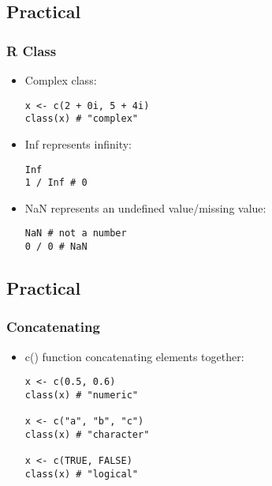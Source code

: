 \documentclass[11pt]{beamer}
\begin{document}
\subsection{Practical}
\begin{frame}[fragile]
\frametitle{{\sf R} Class}
\begin{itemize}
\item Complex class: 
\vspace{0.1in}
\begin{verbatim}
x <- c(2 + 0i, 5 + 4i)
class(x) # "complex"
\end{verbatim}
\vspace{0.1in}
\item Inf represents infinity:
\begin{verbatim}
Inf
1 / Inf # 0
\end{verbatim}
\vspace{0.1in}
\item NaN represents an undefined value/missing value:
\begin{verbatim}
NaN # not a number
0 / 0 # NaN 
\end{verbatim}
\end{itemize}
\end{frame}



\subsection{Practical}
\begin{frame}[fragile]
\frametitle{Concatenating}
\begin{itemize}
\item c() function concatenating elements together:
\begin{verbatim}
x <- c(0.5, 0.6)
class(x) # "numeric"

x <- c("a", "b", "c")
class(x) # "character"

x <- c(TRUE, FALSE)
class(x) # "logical"
\end{verbatim}
\end{itemize}
\end{frame}
\end{document}

